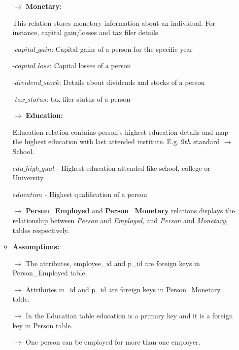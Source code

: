 \documentclass[9pt, twocolumn]{article}
\begin{document}
\begin{enumerate}
\begin{itemize}
			\par $\rightarrow$ \textbf{Monetary:}
		\par This relation stores monetary information about an individual. For instance, capital gain/losses and tax filer details.\\
		\par -$capital\_gain$: Capital gains of a person for the specific year
		\par -$capital\_loss$: Capital losses of a person
		\par -$dividend\_stock$: Details about dividends and stocks of a person
		\par -$tax\_status$: tax filer status of a person\\

			\par $\rightarrow$ \textbf{Education:}
		\par Education relation contains person's highest education details and map the highest education with last attended institute. E.g. 9$th$ standard $\rightarrow$ School.\\
\par $edu\_high\_qual$ - Highest education attended like school, college or University
\par $education$ - Highest qualification of a person\\

			\par $\rightarrow$ \textbf{Person\_Employed} and \textbf{Person\_Monetary} relations displays the relationship between \textit{Person} and \textit{Employed}, and \textit{Person} and \textit{Monetary}, tables respectively.\\



	\item \textbf{Assumptions:}
		\par $\rightarrow$ The attributes, employee\_id and p\_id are foreign keys in Person\_Employed table.
		\par $\rightarrow$ Attributes m\_id and p\_id are foreign keys in Person\_Monetary table.
		\par $\rightarrow$ In the Education table education is a primary key and it is a foreign key in Person table.
		\par $\rightarrow$ One person can be employed for more than one employer.\\
	\end{itemize}


\end{enumerate}
\end{document}
